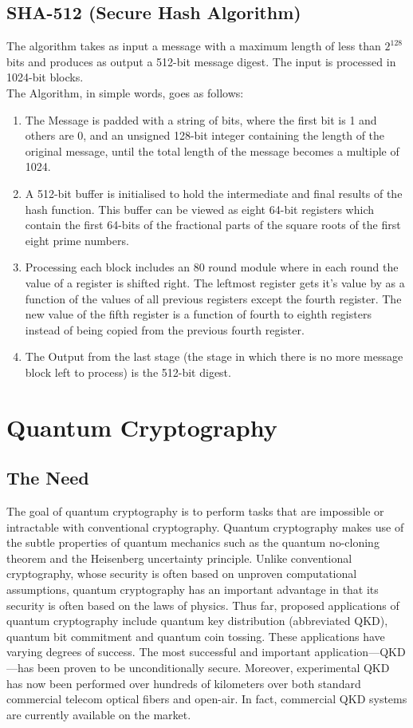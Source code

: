 \documentclass{article}
\begin{document}
\subsection{SHA-512 (Secure Hash Algorithm)}
The algorithm takes as input a message with a maximum length of less than $2^{128}$ bits and produces as output a 512-bit message digest. The input is processed in 1024-bit blocks.\\
The Algorithm, in simple words, goes as follows:\\
\begin{enumerate}
    \item The Message is padded with a string of bits, where the first bit is 1 and others are 0, and an unsigned 128-bit integer containing the length of the original message, until the total length of the message becomes a multiple of 1024.
    \item A 512-bit buffer is initialised to hold the intermediate and final results of the hash function. This buffer can be viewed as eight 64-bit registers which contain the first 64-bits of the fractional parts of the square roots of the first eight prime numbers.
    \item Processing each block includes an 80 round module where in each round the value of a register is shifted right. The leftmost register gets it's value by as a function of the values of all previous registers except the fourth register. The new value of the fifth register is a function of fourth to eighth registers instead of being copied from the previous fourth register.
    \item The Output from the last stage (the stage in which there is no more message block left to process) is the 512-bit digest.
\end{enumerate}

\section{Quantum Cryptography}
\subsection{The Need}
The goal of quantum cryptography
is to perform tasks that are impossible or intractable with conventional cryptography. Quantum
cryptography makes use of the subtle properties of quantum mechanics such as the quantum
no-cloning theorem and the Heisenberg uncertainty principle. Unlike conventional cryptography,
whose security is often based on unproven computational assumptions, quantum cryptography
has an important advantage in that its security is often based on the laws of physics. Thus far,
proposed applications of quantum cryptography include quantum key distribution (abbreviated
QKD), quantum bit commitment and quantum coin tossing. These applications have varying
degrees of success. The most successful and important application—QKD—has been proven to be
unconditionally secure. Moreover, experimental QKD has now been performed over hundreds of
kilometers over both standard commercial telecom optical fibers and open-air. In fact, commercial
QKD systems are currently available on the market.~\cite{lo2008quantumcryptography}
\end{document}
